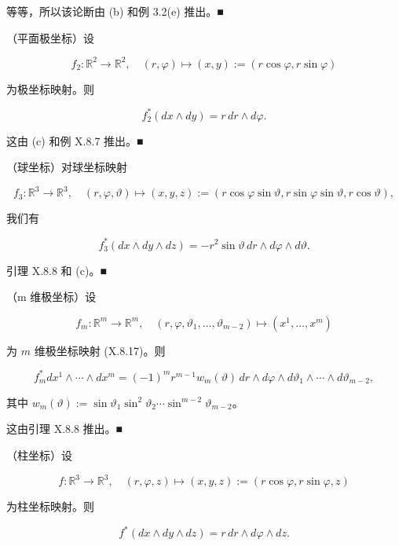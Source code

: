 \begin{example}
\begin{items}
等等，所以该论断由 (b) 和例 3.2(e) 推出。\nobreak\hspace{0.35em}■

\item

（平面极坐标）设

\[
f_{2}: \mathbb{R}^{2} \to \mathbb{R}^{2}, \quad (r, \varphi) \mapsto (x, y) := (r\cos\varphi, r\sin\varphi)
\]

为极坐标映射。则

\[
f_{2}^{*}(dx \wedge dy) = r\,dr \wedge d\varphi.
\]

\proofhead
这由 (c) 和例 X.8.7 推出。\nobreak\hspace{0.35em}■
\item

（球坐标）对球坐标映射

\[
f_{3}: \mathbb{R}^{3} \to \mathbb{R}^{3}, \quad (r, \varphi, \vartheta) \mapsto (x, y, z) := (r\cos\varphi\sin\vartheta, r\sin\varphi\sin\vartheta, r\cos\vartheta),
\]

我们有

\[
f_{3}^{*}(dx \wedge dy \wedge dz) = -r^{2}\sin\vartheta\,dr \wedge d\varphi \wedge d\vartheta.
\]

\proofhead
引理 X.8.8 和 (c)。\nobreak\hspace{0.35em}■
\item

（m 维极坐标）设

\[
f_{m}: \mathbb{R}^{m} \to \mathbb{R}^{m}, \quad (r, \varphi, \vartheta_{1}, \ldots, \vartheta_{m-2}) \mapsto (x^{1}, \ldots, x^{m})
\]

为 $ m $ 维极坐标映射 (X.8.17)。则

\[
f_{m}^{*}dx^{1} \wedge \cdots \wedge dx^{m} = (-1)^{m}r^{m-1}w_{m}(\vartheta)\,dr \wedge d\varphi \wedge d\vartheta_{1} \wedge \cdots \wedge d\vartheta_{m-2},
\]

其中 $ w_{m}(\vartheta) := \sin\vartheta_{1}\sin^{2}\vartheta_{2} \cdots \sin^{m-2}\vartheta_{m-2} $。

\proofhead
这由引理 X.8.8 推出。\nobreak\hspace{0.35em}■
\item

（柱坐标）设

\[
f: \mathbb{R}^{3} \to \mathbb{R}^{3}, \quad (r, \varphi, z) \mapsto (x, y, z) := (r\cos\varphi, r\sin\varphi, z)
\]

为柱坐标映射。则

\[
f^{*}(dx \wedge dy \wedge dz) = r\,dr \wedge d\varphi \wedge dz.
\]


\end{items}
\end{example}
